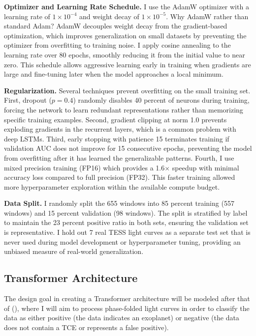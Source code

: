 \documentclass[letterpaper]{article} %
\begin{document}
\textbf{Optimizer and Learning Rate Schedule.} I use the AdamW optimizer with a learning rate of $1 \times 10^{-4}$ and weight decay of $1 \times 10^{-5}$. Why AdamW rather than standard Adam? AdamW decouples weight decay from the gradient-based optimization, which improves generalization on small datasets by preventing the optimizer from overfitting to training noise. I apply cosine annealing to the learning rate over 80 epochs, smoothly reducing it from the initial value to near zero. This schedule allows aggressive learning early in training when gradients are large and fine-tuning later when the model approaches a local minimum.

\textbf{Regularization.} Several techniques prevent overfitting on the small training set. First, dropout ($p=0.4$) randomly disables 40 percent of neurons during training, forcing the network to learn redundant representations rather than memorizing specific training examples. Second, gradient clipping at norm 1.0 prevents exploding gradients in the recurrent layers, which is a common problem with deep LSTMs. Third, early stopping with patience 15 terminates training if validation AUC does not improve for 15 consecutive epochs, preventing the model from overfitting after it has learned the generalizable patterns. Fourth, I use mixed precision training (FP16) which provides a 1.6$\times$ speedup with minimal accuracy loss compared to full precision (FP32). This faster training allowed more hyperparameter exploration within the available compute budget.

\textbf{Data Split.} I randomly split the 655 windows into 85 percent training (557 windows) and 15 percent validation (98 windows). The split is stratified by label to maintain the 23 percent positive ratio in both sets, ensuring the validation set is representative. I hold out 7 real TESS light curves as a separate test set that is never used during model development or hyperparameter tuning, providing an unbiased measure of real-world generalization.

\subsection{Transformer Architecture}

The design goal in creating a Transformer architecture will be modeled after that of \citeauthor{salinas2023distinguishingtransitfalsepositives} (\citeyear{salinas2023distinguishingtransitfalsepositives}), where I will aim to process phase-folded light curves in order to classify the data as either positive (the data indicates an exoplanet) or negative (the data does not contain a TCE or represents a false positive). 
\end{document}
